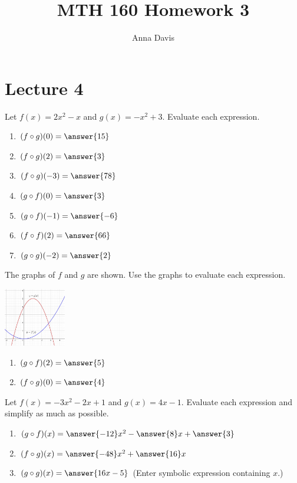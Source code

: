 \documentclass{ximera}
\author{Anna Davis} \title{MTH 160 Homework 3}
\begin{document}
\begin{abstract}

\end{abstract}
\maketitle
 
 \section{Lecture 4}
\begin{problem}\label{prob:160hom2prob6}
Let $f(x)=2x^2-x$ and $g(x)=-x^2+3$.  Evaluate each expression.
\begin{enumerate}
    \item $(f\circ g)(0)=\answer{15}$
    \item $(f\circ g)(2)=\answer{3}$
    \item $(f\circ g)(-3)=\answer{78}$
    \item $(g\circ f)(0)=\answer{3}$
    \item $(g\circ f)(-1)=\answer{-6}$
    \item $(f\circ f)(2)=\answer{66}$
    \item $(g\circ g)(-2)=\answer{2}$
\end{enumerate}
\end{problem}

\begin{problem}\label{prob:160hom2prob7}
The graphs of $f$ and $g$ are shown.  Use the graphs to evaluate each expression.
\begin{image}
   \includegraphics[height=1in]{160H2pic8.jpg}
 \end{image}
  \begin{enumerate}
\item
$(g\circ f)(2)=\answer{5}$

\item
$(f\circ g)(0)=\answer{4}$

  \end{enumerate}
\end{problem}
\begin{problem}\label{prob:160hom2prob8}
Let $f(x)=-3x^2-2x+1$ and $g(x)=4x-1$.  Evaluate each expression and simplify as much as possible.
\begin{enumerate}
    \item $(g\circ f)(x)=\answer{-12}x^2-\answer{8}x+\answer{3}$
    \item $(f\circ g)(x)=\answer{-48}x^2+\answer{16}x$
    \item $(g\circ g)(x)=\answer{16x-5}$ (Enter symbolic expression containing $x$.)
\end{enumerate}
\end{problem}
 
\end{document}
